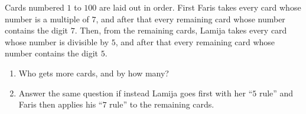 Cards numbered $1$ to $100$ are laid out in order. First Faris takes every card whose number is a multiple of $7$, and after that every remaining card whose number contains the digit $7$. Then, from the remaining cards, Lamija takes every card whose number is divisible by $5$, and after that every remaining card whose number contains the digit $5$.
\begin{enumerate}
\item[(a)] Who gets more cards, and by how many?
\item[(b)] Answer the same question if instead Lamija goes first with her ``$5$ rule'' and Faris then applies his ``$7$ rule'' to the remaining cards.
\end{enumerate}
